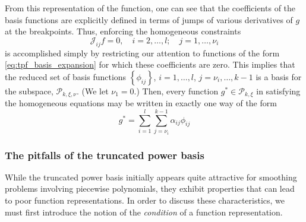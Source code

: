 \documentclass[12pt]{article}
\newcommand{\PP}{\mathcal{P}}
\theoremstyle{definition}
\begin{document}
From this representation of the function, one can see that the coefficients of the basis functions are explicitly defined in terms of jumps of various derivatives of $g$ at the breakpoints. Thus, enforcing the homogeneous constraints 
\[
\mathscr{J}_{ij}f = 0, \quad i=2,\dots, l;\quad j=1,\dots,\nu_i
\]
is accomplished simply by restricting our attention to functions of the form \ref{eq:tpf_basis_expansion} for which these coefficients are zero. This implies that the reduced set of basis functions $\left\{ \phi_{ij} \right\}$, $i=1,\dots,l$, $j=\nu_{i},\dots,k-1$ is a basis for the subspace, $\PP_{k,\xi,\nu}$. (We let $\nu_1 =0$.) Then, every function $g^* \in \PP_{k,\xi}$ in satisfying the homogeneous equations may be written in exactly one way of the form
\begin{equation} \label{eq:tpf_subspace_basis_expansion}
g^* = \sum_{i=1}^l \sum_{j={\nu_i}}^{k-1} \alpha_{ij} \phi_{ij}
\end{equation}

\subsubsection{The pitfalls of the truncated power basis}

While the truncated power basis initially appears quite attractive for smoothing problems involving piecewise polynomials, they exhibit properties that can lead to poor function representations. In order to discuss these characteristics, we must first introduce the notion of the \emph{condition} of a function representation.
\end{document}
